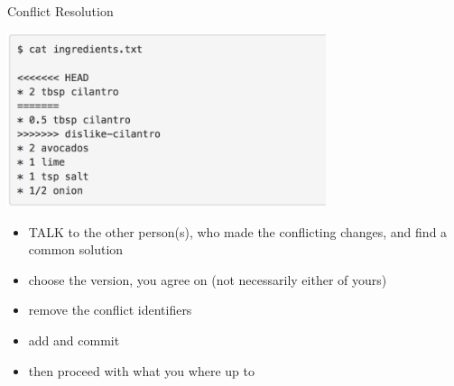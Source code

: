 \begin{frame}{Conflict Resolution}
\footnotesize

\begin{center}
 \includegraphics[width=0.7\textwidth]{pics/git_conflict.png}
\end{center}

\begin{itemize}
 \item TALK to the other person(s), who made the conflicting changes, and
       find a common solution
 \item choose the version, you agree on (not necessarily either of yours)
 \item remove the conflict identifiers
 \item add and commit
 \item then proceed with what you where up to
\end{itemize}


\end{frame}

